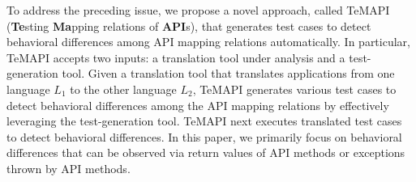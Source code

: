 To address the preceding issue, we propose a novel approach, called TeMAPI (\textbf{Te}sting \textbf{Ma}pping relations of \textbf{API}s), that generates test cases to detect behavioral differences among API mapping relations automatically. In particular, TeMAPI accepts two inputs: a translation tool under analysis and a test-generation tool. Given a translation tool that translates applications from one language $L_1$ to the other language $L_2$, TeMAPI generates various test cases to detect behavioral differences among the API mapping relations by effectively leveraging the test-generation tool. TeMAPI next executes translated test cases to detect behavioral differences. In this paper, we primarily focus on
behavioral differences that can be observed via return values of API methods or exceptions thrown by API methods.

